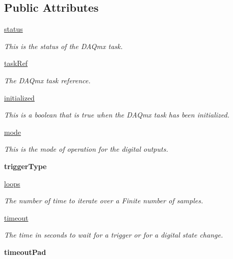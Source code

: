 \subsection*{Public Attributes}
\begin{DoxyCompactItemize}
\item 
\hyperlink{class_chassis_8git_1_1_digital_output_1_1_digital_output_ac80a92816c0356806a9f38349efd5d9a}{status}
\begin{DoxyCompactList}\small\item\em This is the status of the D\-A\-Qmx task. \end{DoxyCompactList}\item 
\hyperlink{class_chassis_8git_1_1_digital_output_1_1_digital_output_a5cf84621110f881f2142f4af58c28926}{task\-Ref}
\begin{DoxyCompactList}\small\item\em The D\-A\-Qmx task reference. \end{DoxyCompactList}\item 
\hyperlink{class_chassis_8git_1_1_digital_output_1_1_digital_output_a04c8f6bec665c117376e77f330f95e46}{initialized}
\begin{DoxyCompactList}\small\item\em This is a boolean that is true when the D\-A\-Qmx task has been initialized. \end{DoxyCompactList}\item 
\hyperlink{class_chassis_8git_1_1_digital_output_1_1_digital_output_a0fe7aca56fb6dd3a7b1b070840b49c56}{mode}
\begin{DoxyCompactList}\small\item\em This is the mode of operation for the digital outputs. \end{DoxyCompactList}\item 
\hypertarget{class_chassis_8git_1_1_digital_output_1_1_digital_output_a8a736e7414b55063694cde94c7f38161}{{\bfseries trigger\-Type}}\label{class_chassis_8git_1_1_digital_output_1_1_digital_output_a8a736e7414b55063694cde94c7f38161}

\item 
\hyperlink{class_chassis_8git_1_1_digital_output_1_1_digital_output_a63c305430aa7ad4e132bd9e32f3ae443}{loops}
\begin{DoxyCompactList}\small\item\em The number of time to iterate over a Finite number of samples. \end{DoxyCompactList}\item 
\hyperlink{class_chassis_8git_1_1_digital_output_1_1_digital_output_a869babc61b66d203a05e3e1998bb4a9f}{timeout}
\begin{DoxyCompactList}\small\item\em The time in seconds to wait for a trigger or for a digital state change. \end{DoxyCompactList}\item 
\hypertarget{class_chassis_8git_1_1_digital_output_1_1_digital_output_acfa136c887a669d231615c1576b0c494}{{\bfseries timeout\-Pad}}\label{class_chassis_8git_1_1_digital_output_1_1_digital_output_acfa136c887a669d231615c1576b0c494}


\end{DoxyCompactItemize}
